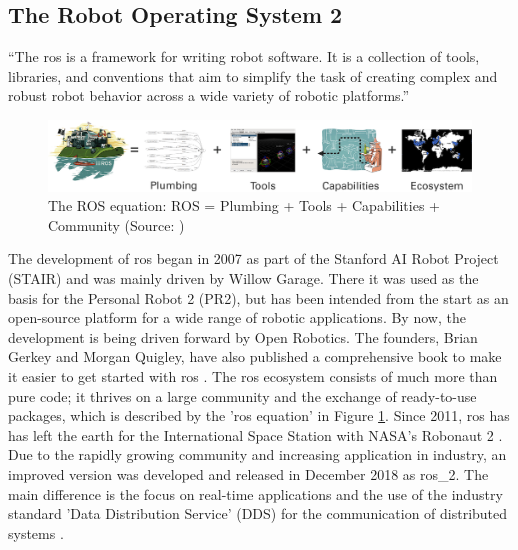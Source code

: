 \subsection{The Robot Operating System 2}
\begin{displayquote}
    \enquote{The \acrfull{ros} is a framework for writing robot software. It is a collection of tools, libraries, and conventions that aim to simplify the task of creating
    complex and robust robot behavior across a wide variety of robotic platforms.} \cite{quigley_programming_2015}
\end{displayquote}
    
\begin{figure}[h]
    \centering
    \includegraphics[width=1\textwidth]{figures/20_state_of_the_art/ros_equation.png}
    \caption[The ROS equation]{The ROS equation: ROS = Plumbing + Tools + Capabilities + Community (Source: \cite{open_robotics_ros_2020})}
    \label{fig:ros_equation}
\end{figure}

The development of \gls{ros} began in 2007 as part of the Stanford AI Robot Project (STAIR) and was mainly driven by Willow Garage. There it was used as the basis for the Personal Robot 2 (PR2), but has been intended from the start as an open-source platform for a wide range of robotic applications. By now, the development is being driven forward by Open Robotics. The founders, Brian Gerkey and Morgan Quigley, have also published a comprehensive book to make it easier to get started with \gls{ros} \cite{quigley_programming_2015}. The \gls{ros} ecosystem consists of much more than pure code; it thrives on a large community and the exchange of ready-to-use packages, which is described by the '\gls{ros} equation' in Figure \ref{fig:ros_equation}. Since 2011, \gls{ros} has has left the earth for the International Space Station with NASA's Robonaut 2 \cite{koubaa_ros_2016}. Due to the rapidly growing community and increasing application in industry, an improved version was developed and released in December 2018 as \gls{ros_2}. The main difference is the focus on real-time applications and the use of the industry standard 'Data Distribution Service' (DDS) for the communication of distributed systems \cite{macenski_robot_2022}.

